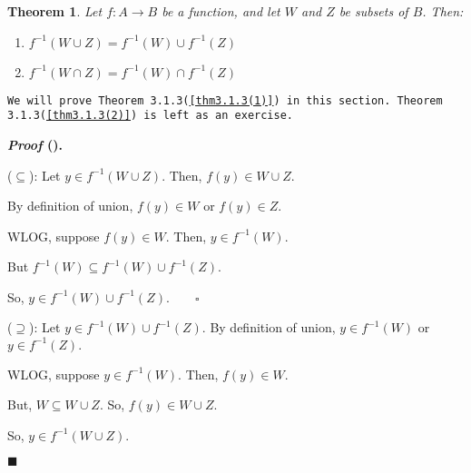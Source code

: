 \documentclass[12pt,a4paper]{article}
\newtheorem{thm}{Theorem}[subsection]
\newcounter{nprf}[subsection]
\newenvironment*{prf}{\par\indent\textbf{\textit{Proof} (\stepcounter{nprf}\thenprf). }\par }{\par\hfill $\blacksquare$\par}
\def\f{f^{-1}}
\begin{document}
\begin{thm}
	Let $f:A\to B$ be a function, and let $W$ and $Z$ be subsets of $B$. Then: 
	\begin{enumerate}
		\item\label{thm3.1.3(1)} $\f(W\cup Z)=\f(W)\cup \f(Z)$
		\item\label{thm3.1.3(2)} $\f(W\cap Z)=\f(W)\cap \f(Z)$
	\end{enumerate}	
\end{thm}
\begin{framed}
\noindent\texttt{We will prove Theorem 3.1.3(\ref{thm3.1.3(1)}) in this section. Theorem 3.1.3(\ref{thm3.1.3(2)}) is left as an exercise.}
\begin{prf}
	($\subseteq$): Let $y\in\f(W\cup Z).$ Then, $f(y)\in W\cup Z.$\par\hspace{5mm} By definition of union, $f(y)\in W$ or $f(y)\in Z.$\par\hspace{5mm} WLOG, suppose $f(y)\in W.$ Then, $y\in\f(W).$\par\hspace{5mm} But $\f(W)\subseteq\f(W)\cup\f(Z).$\par\hspace{5mm} So, $y\in\f(W)\cup\f(Z).\qquad\square$\par 
	($\supseteq$): Let $y\in\f(W)\cup\f(Z).$ By definition of union, $y\in\f(W)$ or $y\in\f(Z).$\par\hspace{5mm} WLOG, suppose $y\in\f(W).$ Then, $f(y)\in W.$\par\hspace{5mm} But, $W\subseteq W\cup Z.$ So, $f(y)\in W\cup Z.$\par\hspace{5mm} So, $y\in\f(W\cup Z).$
\end{prf}
\end{framed}
\end{document}
